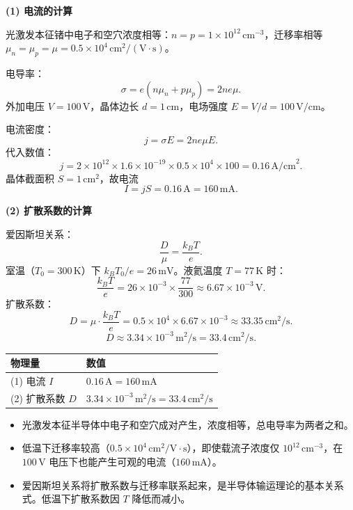 \begin{derivationbox}[标准解题过程]
\textbf{(1) 电流的计算}

光激发本征锗中电子和空穴浓度相等：$n=p=1\times10^{12}\,\text{cm}^{-3}$，迁移率相等 $\mu_n=\mu_p=\mu=0.5\times10^4\,\text{cm}^2/(\text{V}\cdot\text{s})$。

电导率：
\[
\sigma=e(n\mu_n+p\mu_p)=2ne\mu.
\]
外加电压 $V=100\,\text{V}$，晶体边长 $d=1\,\text{cm}$，电场强度 $E=V/d=100\,\text{V/cm}$。

电流密度：
\[
j=\sigma E=2ne\mu E.
\]
代入数值：
\[
j=2\times10^{12}\times1.6\times10^{-19}\times0.5\times10^4\times100=0.16\,\text{A/cm}^2.
\]
晶体截面积 $S=1\,\text{cm}^2$，故电流
\begin{equation}
\boxed{I=jS=0.16\,\text{A}=160\,\text{mA}.}
\end{equation}

\textbf{(2) 扩散系数的计算}

爱因斯坦关系：
\[
\frac{D}{\mu}=\frac{k_BT}{e}.
\]
室温（$T_0=300\,\text{K}$）下 $k_BT_0/e=26\,\text{mV}$。液氦温度 $T=77\,\text{K}$ 时：
\[
\frac{k_BT}{e}=26\times10^{-3}\times\frac{77}{300}\approx6.67\times10^{-3}\,\text{V}.
\]
扩散系数：
\[
D=\mu\cdot\frac{k_BT}{e}=0.5\times10^4\times6.67\times10^{-3}\approx33.35\,\text{cm}^2/\text{s}.
\]
\begin{equation}
\boxed{D\approx3.34\times10^{-3}\,\text{m}^2/\text{s}=33.4\,\text{cm}^2/\text{s}.}
\end{equation}
\end{derivationbox}

\begin{formulabox}[答案汇总]
\begin{center}
\begin{tabular}{ll}
\toprule
\textbf{物理量} & \textbf{数值} \\
\midrule
(1) 电流 $I$ & $0.16\,\text{A}=160\,\text{mA}$ \\
(2) 扩散系数 $D$ & $3.34\times10^{-3}\,\text{m}^2/\text{s}=33.4\,\text{cm}^2/\text{s}$ \\
\bottomrule
\end{tabular}
\end{center}
\end{formulabox}

\begin{insightbox}[物理图像]
\begin{itemize}
    \item 光激发本征半导体中电子和空穴成对产生，浓度相等，总电导率为两者之和。
    \item 低温下迁移率较高（$0.5\times10^4\,\text{cm}^2/\text{V}\cdot\text{s}$），即使载流子浓度仅 $10^{12}\,\text{cm}^{-3}$，在 $100\,\text{V}$ 电压下也能产生可观的电流（$160\,\text{mA}$）。
    \item 爱因斯坦关系将扩散系数与迁移率联系起来，是半导体输运理论的基本关系式。低温下扩散系数因 $T$ 降低而减小。
\end{itemize}
\end{insightbox}
